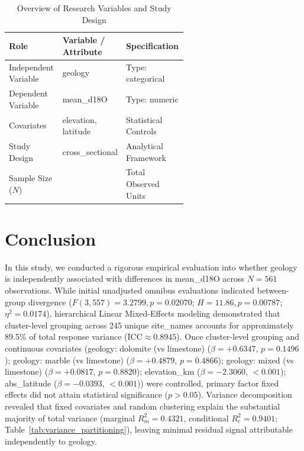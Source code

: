 \documentclass[sn-basic,Numbered]{sn-jnl}%
\begin{document}
\begin{table}[htbp]
\centering
\caption{Overview of Research Variables and Study Design}
\label{tab:variables_summary}
\small
\begin{tabularx}{\linewidth}{@{} >{\raggedright\arraybackslash}p{0.30\linewidth} >{\raggedright\arraybackslash}p{0.30\linewidth} X @{}}
\toprule
\textbf{Role} & \textbf{Variable / Attribute} & \textbf{Specification} \\
\midrule
  Independent Variable & geology & Type: categorical \\
  Dependent Variable & mean\_d18O & Type: numeric \\
  Covariates & elevation, latitude & Statistical Controls \\
  Study Design & cross\_sectional & Analytical Framework \\
  Sample Size ($N$) & 561 & Total Observed Units \\
\bottomrule
\end{tabularx}
\end{table}

\section{Conclusion}
\label{sec:conclusion}
In this study, we conducted a rigorous empirical evaluation into whether geology is independently associated with differences in mean\_d18O across $N = 561$ observations. While initial unadjusted omnibus evaluations indicated between-group divergence ($F(3, 557) = 3.2799, p = 0.02070$; $H = 11.86, p = 0.00787$; $\eta^2 = 0.0174$), hierarchical Linear Mixed-Effects modeling demonstrated that cluster-level grouping across 245 unique site\_names accounts for approximately 89.5\% of total response variance ($\text{ICC} \approx 0.8945$). Once cluster-level grouping and continuous covariates (geology: dolomite (vs limestone) ($\beta = +0.6347$, $p = 0.1496$); geology: marble (vs limestone) ($\beta = +0.4879$, $p = 0.4866$); geology: mixed (vs limestone) ($\beta = +0.0817$, $p = 0.8820$); elevation\_km ($\beta = -2.3060$, $< 0.001$); abs\_latitude ($\beta = -0.0393$, $< 0.001$)) were controlled, primary factor fixed effects did not attain statistical significance ($p > 0.05$). Variance decomposition revealed that fixed covariates and random clustering explain the substantial majority of total variance (marginal $R^2_m = 0.4321$, conditional $R^2_c = 0.9401$; Table~\ref{tab:variance_partitioning}), leaving minimal residual signal attributable independently to geology.
\end{document}
